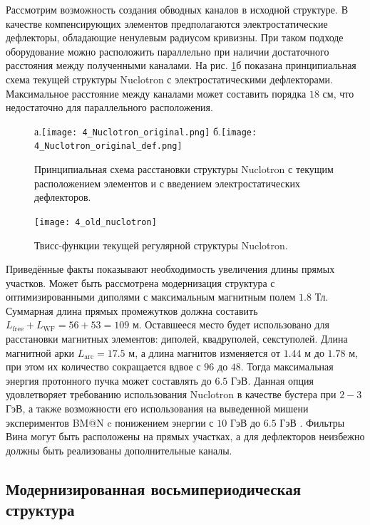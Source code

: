 \par Рассмотрим возможность создания обводных каналов в исходной структуре. В качестве компенсирующих элементов предполагаются электростатические дефлекторы, обладающие ненулевым радиусом кривизны. При таком подходе оборудование можно расположить параллельно при наличии достаточного расстояния между полученными каналами. На рис. \ref{fig:4_Nuclotron_original}б показана принципиальная схема текущей структуры Nuclotron с электростатическими дефлекторами. Максимальное расстояние между каналами может составить порядка $18$ см, что недостаточно для параллельного расположения.

\begin{figure}[!h]
	\centering
	а.\texttt{[image: 4\_Nuclotron\_original.png]}
	б.\texttt{[image: 4\_Nuclotron\_original\_def.png]}
	\caption{Принципиальная схема расстановки структуры Nuclotron с текущим расположением элементов и с введением электростатических дефлекторов.}
	\label{fig:4_Nuclotron_original}
\end{figure}

\begin{figure}[!h]
  \centering
	\texttt{[image: 4\_old\_nuclotron]}
   \caption{Твисс-функции текущей регулярной структуры Nuclotron.}
   \label{fig:4_old_nuclotron}
\end{figure}

\par Приведённые факты показывают необходимость увеличения длины прямых участков. Может быть рассмотрена модернизация структура с оптимизированными диполями с максимальным магнитным полем $1.8$ Тл. Суммарная длина прямых промежутков должна составить $L_{\text{free}}+L_{\text{WF}}=56+53 = 109$ м. Оставшееся место будет использовано для расстановки магнитных элементов: диполей, квадруполей, секступолей. Длина магнитной арки $L_{\textrm{arc}}=17.5$ м, а длина магнитов изменяется от $1.44$ м до $1.78$ м, при этом их количество сокращается вдвое с $96$ до $48$. Тогда максимальная энергия протонного пучка может составлять до $6.5$ ГэВ. Данная опция удовлетворяет требованию использования Nuclotron в качестве бустера при $2-3$ ГэВ, а также возможности его использования на выведенной мишени экспериментов BM@N c понижением энергии с $10$ ГэВ до $6.5$ ГэВ \cite{kovalenko:nuclotron}. Фильтры Вина могут быть расположены на прямых участках, а для дефлекторов неизбежно должны быть реализованы дополнительные каналы.

	\subsection{Модернизированная восьмипериодическая структура}\label{sec:EDM/optics/8period}

